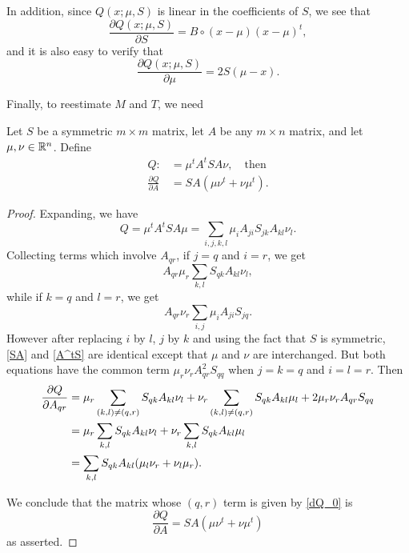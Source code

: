 \documentclass[12pt,leqno]{article}
\begin{document}
In addition, since $Q(x;\mu,S)$ is linear in the coefficients of $S$, we see that
\begin{equation}\label{dQ_dS}
\frac{\partial{Q(x;\mu,S)}}{\partial{S}} = B\circ(x-\mu)(x-\mu)^t,
\end{equation}
and it is also easy to verify that
\begin{equation}\label{dQ_dmu}
\frac{\partial{Q(x;\mu,S)}}{\partial{\mu}} = 2S(\mu-x).
\end{equation}

Finally, to reestimate $M$ and $T$, we need

\begin{Lem}\label{dQdA}
  Let $S$ be a symmetric $m\times{m}$ matrix, let $A$ be any $m\times{n}$ matrix,
  and let $\mu,\nu\in {\mathbb R}^n$.  Define
  \begin{align*}
  Q :&= \mu^tA^tSA\nu,\quad\text{then}\\
  \frac{\partial{Q}}{\partial{A}} &= SA(\mu\nu^t+\nu\mu^t).
  \end{align*}
\end{Lem}
\begin{proof}
Expanding, we have
$$
Q = \mu^tA^tSA\mu = \sum_{i,j,k,l}\mu_iA_{ji}S_{jk}A_{kl}\nu_l.
$$
Collecting terms which involve $A_{qr}$, if $j=q$ and $i=r$, we get
\begin{equation}\label{SA}
A_{qr}\mu_r\sum_{k,l}S_{qk}A_{kl}\nu_l,
\end{equation}
while if $k=q$ and $l=r$, we get
\begin{equation}\label{A^tS}
A_{qr}\nu_r\sum_{i,j}\mu_iA_{ji}S_{jq}.
\end{equation}
However after replacing $i$ by $l$, $j$ by $k$ and using the fact that $S$ is symmetric,
\eqref{SA} and \eqref{A^tS} are identical except that $\mu$ and $\nu$ are interchanged.
But both equations have the common term
$\mu_r\nu_rA_{qr}^2S_{qq}$ when $j = k = q$ and $i = l = r$.
Then
\begin{align}
  \notag\frac{\partial{Q}}{\partial{A_{qr}}} &= \mu_r\sum_{(k,l)\neq(q,r)}S_{qk}A_{kl}\nu_l
  +\nu_r\sum_{(k,l)\neq(q,r)}S_{qk}A_{kl}\mu_l+ 2\mu_r\nu_rA_{qr}S_{qq}\\
  &= \mu_r\sum_{k,l}S_{qk}A_{kl}\nu_l + \nu_r\sum_{k,l}S_{qk}A_{kl}\mu_l\notag\\
  &= \sum_{k,l}S_{qk}A_{kl}(\mu_l\nu_r + \nu_l\mu_r).\label{dQ_0}
\end{align}

We conclude that the matrix whose $(q,r)$ term is given by \eqref{dQ_0} is
$$
\frac{\partial{Q}}{\partial{A}} = SA(\mu\nu^t+\nu\mu^t)
$$
as asserted.
\end{proof}
\end{document}
